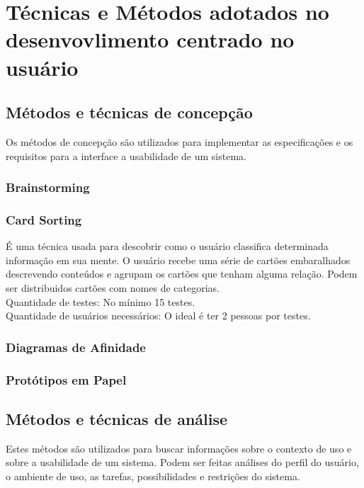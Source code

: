 \chapter{Técnicas e Métodos adotados no desenvovlimento centrado no usuário}



\section{Métodos e técnicas de concepção}

Os métodos de concepção são utilizados para implementar as especificações e os requisitos para a interface a usabilidade de um sistema.

\subsection{Brainstorming}

\subsection{Card Sorting}

	É uma técnica usada para descobrir como o usuário classifica determinada informação em sua mente. O usuário recebe uma série de cartões embaralhados descrevendo conteúdos e agrupam os cartões que tenham alguma relação. Podem ser distribuidos cartões com nomes de categorias. \\
	
	Quantidade de testes: No mínimo 15 testes. \\
	Quantidade de usuários necessários: O ideal é ter 2 pessoas por testes.
	
\subsection{Diagramas de Afinidade}

\subsection{Protótipos em Papel}


\section{Métodos e técnicas de análise}

Estes métodos são utilizados para buscar informações sobre o contexto de uso e sobre a usabilidade de um sistema. Podem ser feitas análises do perfil do usuário, o ambiente de uso, as tarefas, possibilidades e restrições do sistema.

